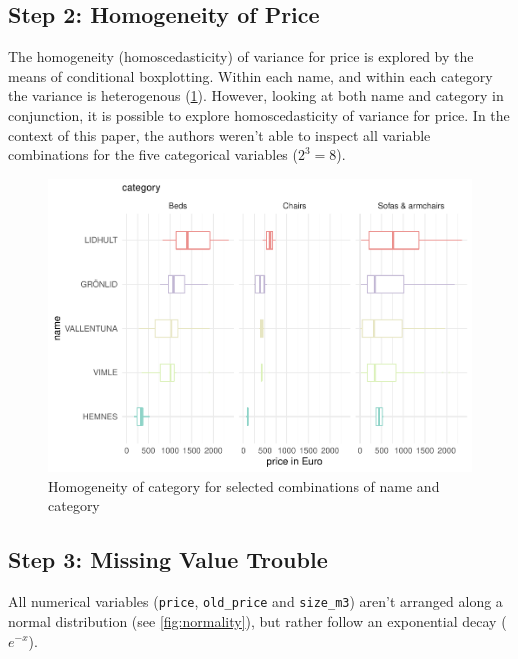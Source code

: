 \documentclass[a4paper, nobind]{templates/ociamthesis}
\begin{document}
\hypertarget{step-2-homogeneity-of-price}{%
\subsection{Step 2: Homogeneity of Price}\label{step-2-homogeneity-of-price}}

The homogeneity (homoscedasticity) of variance for price is explored by the means of conditional boxplotting.
Within each name, and within each category the variance is heterogenous (\ref{fig:homogeneity}). However, looking at both name and category in conjunction, it is possible to explore homoscedasticity of variance for price.
In the context of this paper, the authors weren't able to inspect all variable combinations for the five categorical variables (\(2^3=8\)).

\begin{figure}
\includegraphics[width=1\linewidth]{_main_files/figure-latex/homogeneity-1} \caption{Homogeneity of category for selected combinations of name and category}\label{fig:homogeneity}
\end{figure}

\hypertarget{step-3-missing-value-trouble}{%
\subsection{Step 3: Missing Value Trouble}\label{step-3-missing-value-trouble}}

All numerical variables (\texttt{price}, \texttt{old\_price} and \texttt{size\_m3}) aren't arranged along a normal distribution (see \ref{fig:normality}), but rather follow an exponential decay (\(e^{-x}\)).
\end{document}
